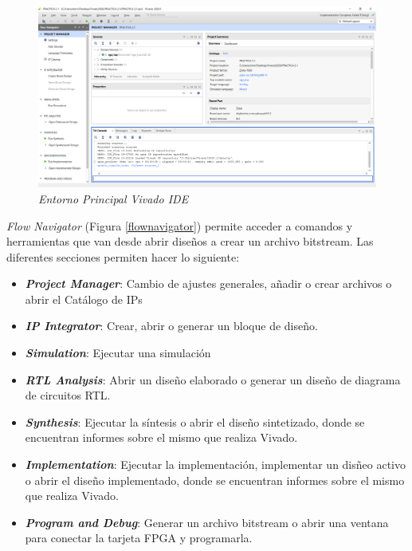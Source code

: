 \begin{figure}[H]
    \centering
    \includegraphics[width = 1\textwidth]{imagenes/vivado2.png}
    \caption{\textit{Entorno Principal Vivado IDE}}\label{vivado2}
\end{figure}

\textit{Flow Navigator} (Figura \ref{flownavigator}) permite acceder a comandos y herramientas que van desde abrir diseños a crear un archivo bitstream. Las 
diferentes secciones permiten hacer lo siguiente:
\begin{itemize}
    \item \textit{\textbf{Project Manager}}: Cambio de ajustes generales, añadir o crear archivos o abrir el Catálogo de IPs
    \item \textit{\textbf{IP Integrator}}: Crear, abrir o generar un bloque de diseño. 
    \item \textit{\textbf{Simulation}}: Ejecutar una simulación
    \item \textit{\textbf{RTL Analysis}}: Abrir un diseño elaborado o generar un diseño de diagrama de circuitos RTL.
    \item \textit{\textbf{Synthesis}}: Ejecutar la síntesis o abrir el diseño sintetizado, donde se encuentran informes sobre el mismo que realiza Vivado.
    \item \textit{\textbf{Implementation}}: Ejecutar la implementación, implementar un disñeo activo o abrir el diseño implementado, donde se encuentran informes sobre el mismo que realiza Vivado.
    \item \textit{\textbf{Program and Debug}}: Generar un archivo bitstream o abrir una ventana para conectar la tarjeta FPGA y programarla.
\end{itemize}

